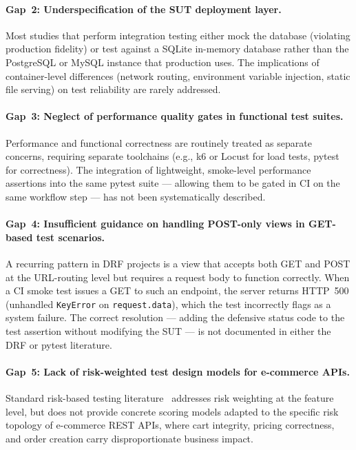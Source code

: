 \documentclass[12pt, a4paper]{article}
\begin{document}
\paragraph{Gap~2: Underspecification of the SUT deployment layer.}
Most studies that perform integration testing either mock the database (violating
production fidelity) or test against a SQLite in-memory database rather than the
PostgreSQL or MySQL instance that production uses.  The implications of
container-level differences (network routing, environment variable injection,
static file serving) on test reliability are rarely addressed.

\paragraph{Gap~3: Neglect of performance quality gates in functional test suites.}
Performance and functional correctness are routinely treated as separate
concerns, requiring separate toolchains (e.g., k6 or Locust for load tests,
pytest for correctness).  The integration of lightweight, smoke-level
performance assertions into the same pytest suite — allowing them to be gated
in CI on the same workflow step — has not been systematically described.

\paragraph{Gap~4: Insufficient guidance on handling POST-only views in GET-based test scenarios.}
A recurring pattern in DRF projects is a view that accepts both GET and POST at
the URL-routing level but requires a request body to function correctly.  When a
CI smoke test issues a GET to such an endpoint, the server returns HTTP~500
(unhandled \texttt{KeyError} on \texttt{request.data}), which the test
incorrectly flags as a system failure.  The correct resolution — adding the
defensive status code to the test assertion without modifying the SUT — is not
documented in either the DRF or pytest literature.

\paragraph{Gap~5: Lack of risk-weighted test design models for e-commerce APIs.}
Standard risk-based testing literature~\cite{risk_based_testing} addresses
risk weighting at the feature level, but does not provide concrete scoring
models adapted to the specific risk topology of e-commerce REST APIs, where
cart integrity, pricing correctness, and order creation carry disproportionate
business impact.
\end{document}
